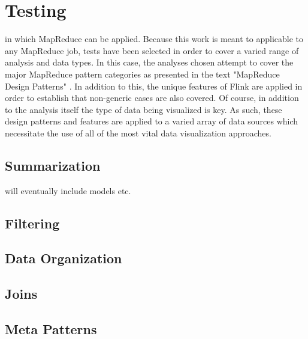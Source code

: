 \chapter{Testing}
\label{sec:testing}
 in which MapReduce can be applied. Because this work is meant to applicable to any MapReduce job, tests have been selected in order to cover a varied range of analysis and data types. In this case, the analyses chosen attempt to cover the major MapReduce pattern categories as presented in the text "MapReduce Design Patterns" \cite{Miner2012}. In addition to this, the unique features of Flink are applied in order to establish that non-generic cases are also covered. Of course, in addition to the analysis itself the type of data being visualized is key. As such, these design patterns and features are applied to a varied array of data sources which necessitate the use of all of the most vital data visualization approaches.

\section{Summarization}
\label{sec:summarization}
 will eventually include models etc.

\section{Filtering}
\label{sec:filtering}

\section{Data Organization}
\label{sec:dataorganization}

\section{Joins}
\label{sec:joins}

\section{Meta Patterns}
\label{sec:metapatterns}

